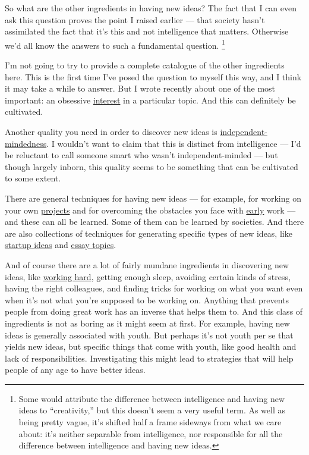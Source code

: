 So what are the other ingredients in having new ideas? The fact that I
can even ask this question proves the point I raised earlier --- that
society hasn't assimilated the fact that it's this and not intelligence
that matters. Otherwise we'd all know the answers to such a fundamental
question. \footnote{Some would attribute the difference between intelligence and
having new ideas to ``creativity,'' but this doesn't seem a very useful
term. As well as being pretty vague, it's shifted half a frame sideways
from what we care about: it's neither separable from intelligence, nor
responsible for all the difference between intelligence and having new
ideas.}

I'm not going to try to provide a complete catalogue of the other
ingredients here. This is the first time I've posed the question to
myself this way, and I think it may take a while to answer. But I wrote
recently about one of the most important: an obsessive
\href{genius.html}{interest} in a particular topic. And this can
definitely be cultivated.

Another quality you need in order to discover new ideas is
\href{think.html}{independent-mindedness}. I wouldn't want to claim that
this is distinct from intelligence --- I'd be reluctant to call someone
smart who wasn't independent-minded --- but though largely inborn, this
quality seems to be something that can be cultivated to some extent.

There are general techniques for having new ideas --- for example, for
working on your own \href{own.html}{projects} and for overcoming the
obstacles you face with \href{early.html}{early} work --- and these can
all be learned. Some of them can be learned by societies. And there are
also collections of techniques for generating specific types of new
ideas, like \href{startupideas.html}{startup ideas} and
\href{essay.html}{essay topics}.

And of course there are a lot of fairly mundane ingredients in
discovering new ideas, like \href{hwh.html}{working hard}, getting
enough sleep, avoiding certain kinds of stress, having the right
colleagues, and finding tricks for working on what you want even when
it's not what you're supposed to be working on. Anything that prevents
people from doing great work has an inverse that helps them to. And this
class of ingredients is not as boring as it might seem at first. For
example, having new ideas is generally associated with youth. But
perhaps it's not youth per se that yields new ideas, but specific things
that come with youth, like good health and lack of responsibilities.
Investigating this might lead to strategies that will help people of any
age to have better ideas.

